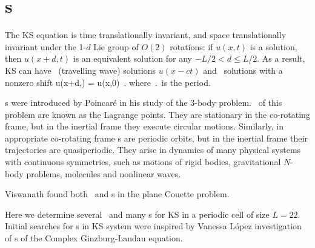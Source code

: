 
\section{\Rpo s}

The KS equation   is time translationally invariant,
and 
space translationally invariant
under the 1-$d$ Lie group of $O(2)$ rotations: if
$u(x,t)$ is a solution, then $u(x+d,t)$ is an equivalent
solution for any $-L/2 < d \leq L/2$.
As a result,
KS can have \reqva\ (travelling wave) solutions
$u(x-ct)$ and \rpo\ solutions with a nonzero shift
\beq
u(x+d,\period{}) = u(x,0)
\,.
where $\period{}$ is the period.


{\Rpo s} were introduced by Poincar\'e in his study of 
the 3-body problem.
\Reqva\ of this problem
are known as the Lagrange points. They are stationary in
the co-rotating frame, but
in the inertial frame they execute circular motions.
Similarly, in appropriate co-rotating frame
{\rpo s} are periodic orbits, 
but in the inertial frame their trajectories
are quasiperiodic. 
They arise in dynamics of many physical systems
with continuous symmetries, such as motions of rigid bodies, gravitational
$N$-body problems, molecules and nonlinear waves.

Viswanath %
found both \reqva\ and \rpo s in the plane Couette problem.

Here we determine 
several \eqva\ and many \rpo s for 
KS in a periodic cell of size $L=22$.
Initial searches for \rpo s in KS system were
inspired by Vanessa L{\'o}pez investigation
of {\Rpo s} of the Complex Ginzburg-Landau equation.

